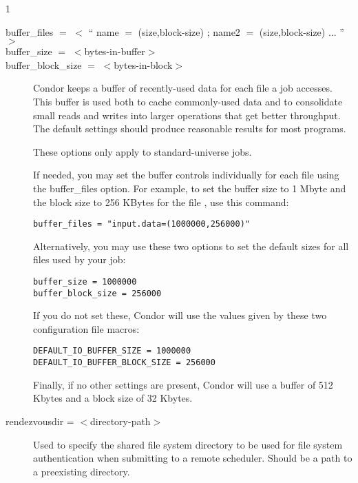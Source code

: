 \begin{ManPage}{\label{man-condor-submit}}{1}
\begin{description}

\item[buffer\_files $=$ $<$ `` name $=$ (size,block-size) ; name2 $=$ (size,block-size) ... '' $>$ ]
\item[buffer\_size $=$ $<$bytes-in-buffer$>$]
\item[buffer\_block\_size $=$ $<$bytes-in-block$>$]
Condor keeps a buffer of recently-used data for each file a job accesses.
This buffer is used both to cache commonly-used data and to consolidate small
reads and writes into larger operations that get better throughput.
The default settings should produce reasonable results for most programs.

These options only apply to standard-universe jobs.

If needed, you may set the buffer controls individually for each file using
the buffer\_files option. For example, to set the buffer size to 1 Mbyte and
the block size to 256 KBytes for the file , use this command:

\begin{verbatim}
buffer_files = "input.data=(1000000,256000)"
\end{verbatim}

Alternatively, you may use these two options to set
the default sizes for all files used by your job:

\begin{verbatim}
buffer_size = 1000000
buffer_block_size = 256000
\end{verbatim}

If you do not set these, Condor will use the values given by these
two configuration file macros:

\begin{verbatim}
DEFAULT_IO_BUFFER_SIZE = 1000000
DEFAULT_IO_BUFFER_BLOCK_SIZE = 256000
\end{verbatim}

Finally, if no other settings are present, Condor will use
a buffer of 512 Kbytes
and a block size of 32 Kbytes.


\item[rendezvousdir = $<$directory-path$>$] Used to specify the 
shared file system directory to be used for file system authentication
when submitting to a remote scheduler.  Should be a path to a preexisting 
directory.  


\end{description}
\end{ManPage}
